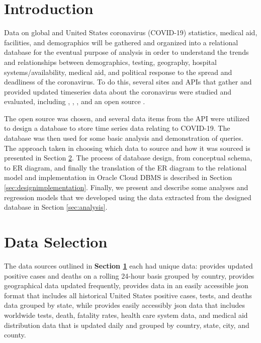 \documentclass[11pt]{article}
\newcommand{\MYhref}[3][blue]{\href{#2}{\color{#1}{#3}}}%
\begin{document}
\pagebreak

\section{Introduction}
\label{sec:Intro}
\noindent
Data on global and United States coronavirus (COVID-19) statistics, medical aid, facilities, and demographics will be gathered and organized into a relational database for the eventual purpose of analysis in order to understand the trends and relationships between demographics, testing, geography, hospital systems/availability, medical aid, and political response to the spread and deadliness of the coronavirus. To do this, several sites and APIs that gather and provided updated timeseries data about the coronavirus were studied and evaluated, including \MYhref{https://www.worldometers.info/coronavirus/}{Worldometer}, \MYhref{https://coronavirus.jhu.edu/map.html}{John Hopkins Coronavirus Resource Center}, \MYhref{https://covidtracking.com/api}{The Covid Tracking Project}, and an open source \MYhref{https://www.npmjs.com/package/covid19-api}{Covid-19 API}. 

\noindent
The open source \MYhref{https://www.npmjs.com/package/covid19-api}{Covid-19 API} was chosen, and several data items from the API were utilized to design a database to store time series data relating to COVID-19. The database was then used for some basic analysis and demonstration of queries. The approach taken in choosing which data to source and how it was sourced is presented in Section \ref{sec:approachsec}. The process of database design, from conceptual schema, to ER diagram, and finally the translation of the ER diagram to the relational model and implementation in Oracle Cloud DBMS is described in Section \ref{sec:designimplementation}. Finally, we present and describe some analyses and regression models that we developed using the data extracted from the designed database in Section \ref{sec:analysis}.

\section{Data Selection}
\label{sec:approachsec}

\noindent
The data sources outlined in \textbf{Section \ref{sec:Intro}} each had unique data: \MYhref{https://www.worldometers.info/coronavirus/}{Worldometer} provides updated positive cases and deaths on a rolling 24-hour basis grouped by country, \MYhref{https://coronavirus.jhu.edu/map.html}{John Hopkins Coronavirus Resource Center} provides geographical data updated frequently, \MYhref{https://covidtracking.com/api}{The Covid Tracking Project} provides data in an easily accessible json format that includes all historical United States positive cases, tests, and deaths data grouped by state, while \MYhref{https://www.npmjs.com/package/covid19-api}{Covid-19 API} provides easily accessibly json data that includes worldwide tests, death, fatality rates, health care system data, and medical aid distribution data that is updated daily and grouped by country, state, city, and county.
\end{document}

